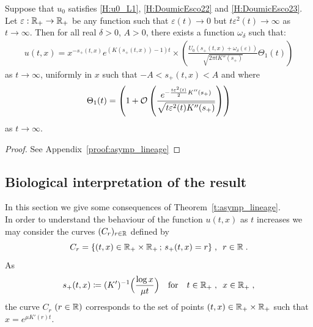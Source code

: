 \documentclass[11pt]{amsart}
\begin{document}
\begin{theorem}\label{t:asymp_lineage}
    Suppose that  $u_0$ satisfies \eqref{H:u0_L1}, \eqref{H:DoumicEsco22} and \eqref{H:DoumicEsco23}. 
    Let $\varepsilon : \mathbb{R}_+ \to \mathbb{R}_+$ be any function such that $\varepsilon(t) \to 0$ but $t\varepsilon^2(t) \to \infty$ as $t \to \infty$. 
    Then for all real $\delta > 0$, $A > 0$, there exists a function $\omega_\delta$ such that:
\begin{equation*}
    \begin{split}
    u(t,x) = x^{-s_+(t,x)}e^{(K(s_+(t,x))-1)t} \times 
    \left( \frac{U_0(s_+(t,x)+\omega_\delta(\varepsilon))}{\sqrt{2\pi tK''(s_+)}} \Theta_1(t)\right)
    \end{split}
\end{equation*}
as $t\to \infty$, uniformly in $x$ such that $-A < s_+(t,x)< A$ and where 
\begin{align*}
    \Theta_1(t) = \left(1 + \mathcal{O} \left( \frac{e^{-\frac{t\varepsilon^2(t)}{2}K''(s_+)}}{\sqrt{t\varepsilon^2(t)K''(s_+)}} \right) \right)
\end{align*}
as $t \to \infty$. 
\end{theorem}
\begin{proof} See Appendix~\ref{proof:asymp_lineage}
\end{proof}

\subsection{Biological interpretation of the result}
\label{s:bio_inter_courbe}

In this section we give some consequences of Theorem~\ref{t:asymp_lineage}. \\

In order to understand the behaviour of the function $u(t, x)$ as $t$ increases we may consider the curves $(C_r)_{r \in \mathbb{R}}$ defined by
$$ C_r = \{(t,x) \in \mathbb{R}_+ \times \mathbb{R}_+ \,;\, s_+(t, x) = r\}\; , \enspace r \in \mathbb{R} \; . $$ 
As \begin{align*}
    s_+(t,x) \coloneqq (K')^{-1} \Big( \frac{\log x}{\mu t} \Big)
    \quad \text{for} \quad t \in \mathbb{R}_+ \; , \enspace x \in \mathbb{R}_+
    \; ,
\end{align*}
the curve $C_r$ $(r \in \mathbb{R})$ corresponds to the set of points $(t,x) \in \mathbb{R}_+ \times \mathbb{R}_+$ such that $x = e^{\mu K'(r) t}.$ \\
\end{document}
